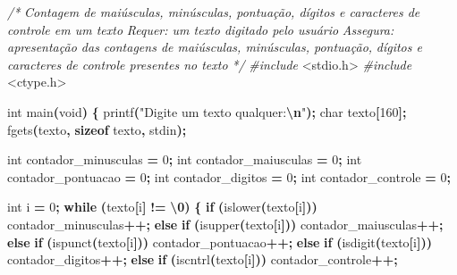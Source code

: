 \documentclass[
  11pt,
  a4paper,
]{scrbook}
\newenvironment{Shaded}{\begin{snugshade}}{\end{snugshade}}
\newcommand{\CharTok}[1]{\textcolor[rgb]{0.31,0.60,0.02}{#1}}
\newcommand{\CommentTok}[1]{\textcolor[rgb]{0.56,0.35,0.01}{\textit{#1}}}
\newcommand{\ControlFlowTok}[1]{\textcolor[rgb]{0.13,0.29,0.53}{\textbf{#1}}}
\newcommand{\DataTypeTok}[1]{\textcolor[rgb]{0.13,0.29,0.53}{#1}}
\newcommand{\DecValTok}[1]{\textcolor[rgb]{0.00,0.00,0.81}{#1}}
\newcommand{\ImportTok}[1]{#1}
\newcommand{\KeywordTok}[1]{\textcolor[rgb]{0.13,0.29,0.53}{\textbf{#1}}}
\newcommand{\NormalTok}[1]{#1}
\newcommand{\OperatorTok}[1]{\textcolor[rgb]{0.81,0.36,0.00}{\textbf{#1}}}
\newcommand{\PreprocessorTok}[1]{\textcolor[rgb]{0.56,0.35,0.01}{\textit{#1}}}
\newcommand{\SpecialCharTok}[1]{\textcolor[rgb]{0.81,0.36,0.00}{\textbf{#1}}}
\newcommand{\StringTok}[1]{\textcolor[rgb]{0.31,0.60,0.02}{#1}}
\begin{document}
\begin{Shaded}
\begin{Highlighting}[]
\CommentTok{/*}
\CommentTok{Contagem de maiúsculas, minúsculas, pontuação, dígitos e caracteres de}
\CommentTok{    controle em um texto}
\CommentTok{Requer: um texto digitado pelo usuário}
\CommentTok{Assegura: apresentação das contagens de maiúsculas, minúsculas, pontuação,}
\CommentTok{    dígitos e caracteres de controle presentes no texto}
\CommentTok{*/}
\PreprocessorTok{\#include }\ImportTok{\textless{}stdio.h\textgreater{}}
\PreprocessorTok{\#include }\ImportTok{\textless{}ctype.h\textgreater{}}

\DataTypeTok{int}\NormalTok{ main}\OperatorTok{(}\DataTypeTok{void}\OperatorTok{)} \OperatorTok{\{}
\NormalTok{    printf}\OperatorTok{(}\StringTok{"Digite um texto qualquer:}\SpecialCharTok{\textbackslash{}n}\StringTok{"}\OperatorTok{);}
    \DataTypeTok{char}\NormalTok{ texto}\OperatorTok{[}\DecValTok{160}\OperatorTok{];}
\NormalTok{    fgets}\OperatorTok{(}\NormalTok{texto}\OperatorTok{,} \KeywordTok{sizeof}\NormalTok{ texto}\OperatorTok{,}\NormalTok{ stdin}\OperatorTok{);}

    \DataTypeTok{int}\NormalTok{ contador\_minusculas }\OperatorTok{=} \DecValTok{0}\OperatorTok{;}
    \DataTypeTok{int}\NormalTok{ contador\_maiusculas }\OperatorTok{=} \DecValTok{0}\OperatorTok{;}
    \DataTypeTok{int}\NormalTok{ contador\_pontuacao }\OperatorTok{=} \DecValTok{0}\OperatorTok{;}
    \DataTypeTok{int}\NormalTok{ contador\_digitos }\OperatorTok{=} \DecValTok{0}\OperatorTok{;}
    \DataTypeTok{int}\NormalTok{ contador\_controle }\OperatorTok{=} \DecValTok{0}\OperatorTok{;}

    \DataTypeTok{int}\NormalTok{ i }\OperatorTok{=} \DecValTok{0}\OperatorTok{;}
    \ControlFlowTok{while} \OperatorTok{(}\NormalTok{texto}\OperatorTok{[}\NormalTok{i}\OperatorTok{]} \OperatorTok{!=} \CharTok{\textquotesingle{}}\SpecialCharTok{\textbackslash{}0}\CharTok{\textquotesingle{}}\OperatorTok{)} \OperatorTok{\{}
        \ControlFlowTok{if} \OperatorTok{(}\NormalTok{islower}\OperatorTok{(}\NormalTok{texto}\OperatorTok{[}\NormalTok{i}\OperatorTok{]))}
\NormalTok{            contador\_minusculas}\OperatorTok{++;}
        \ControlFlowTok{else} \ControlFlowTok{if} \OperatorTok{(}\NormalTok{isupper}\OperatorTok{(}\NormalTok{texto}\OperatorTok{[}\NormalTok{i}\OperatorTok{]))}
\NormalTok{            contador\_maiusculas}\OperatorTok{++;}
        \ControlFlowTok{else} \ControlFlowTok{if} \OperatorTok{(}\NormalTok{ispunct}\OperatorTok{(}\NormalTok{texto}\OperatorTok{[}\NormalTok{i}\OperatorTok{]))}
\NormalTok{            contador\_pontuacao}\OperatorTok{++;}
        \ControlFlowTok{else} \ControlFlowTok{if} \OperatorTok{(}\NormalTok{isdigit}\OperatorTok{(}\NormalTok{texto}\OperatorTok{[}\NormalTok{i}\OperatorTok{]))}
\NormalTok{            contador\_digitos}\OperatorTok{++;}
        \ControlFlowTok{else} \ControlFlowTok{if} \OperatorTok{(}\NormalTok{iscntrl}\OperatorTok{(}\NormalTok{texto}\OperatorTok{[}\NormalTok{i}\OperatorTok{]))}
\NormalTok{            contador\_controle}\OperatorTok{++;}


\end{Highlighting}
\end{Shaded}
\end{document}
